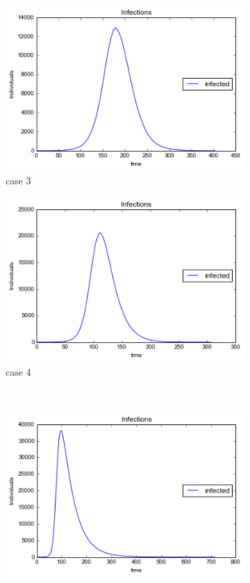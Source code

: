 \begin{figure}[!htb]
\begin{subfigure}[b]{0.3\textwidth}
        \includegraphics[width=\textwidth]{images/2infections.png} 
        \caption{case 3}
        \label{c}
    \end{subfigure}
       \begin{subfigure}[b]{0.3\textwidth}
        \includegraphics[width=\textwidth]{images/4infections}
        \caption{case 4}
        \label{d}
    \end{subfigure}
    ~ %
    \begin{subfigure}[b]{0.3\textwidth}
        \includegraphics[width=\textwidth]{images/5infections.png} 

\end{subfigure}
\end{figure}
